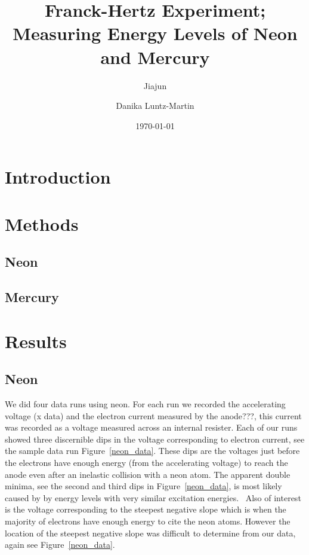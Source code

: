 \documentclass[prb,preprint]{revtex4-1}
\begin{document}
\title{Franck-Hertz Experiment; Measuring Energy Levels of Neon and Mercury}

\author{Jiajun}


\author{Danika Luntz-Martin}


\date{\today}

\begin{abstract}


\end{abstract}


\maketitle 


\section{Introduction} 


\section{Methods}

\subsection{Neon}
\subsection{Mercury}


\section{Results}

\subsection{Neon}

We did four data runs using neon. For each run we recorded the accelerating voltage (x data) and the electron current measured by the anode???, this current was recorded as a voltage measured across an internal resister. Each of our runs showed three discernible dips in the voltage corresponding to electron current, see the sample data run Figure~\ref{neon_data}. These dips are the voltages just before the electrons have enough energy (from the accelerating voltage) to reach the anode even after an inelastic collision with a neon atom. The apparent double minima, see the second and third dips in Figure~\ref{neon_data}, is most likely caused by by energy levels with very similar excitation energies.~\cite{XXX} Also of interest is the voltage corresponding to the steepest negative slope which is when the majority of electrons have enough energy to cite the neon atoms. However the location of the steepest negative slope was difficult to determine from our data, again see Figure~\ref{neon_data}.
\end{document}
